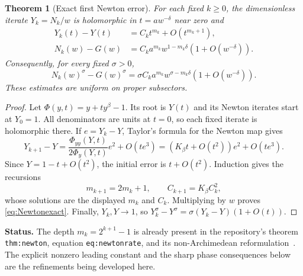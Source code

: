 \documentclass[11pt,a4paper]{article}
\newtheorem{theorem}{Theorem}[section]
\theoremstyle{definition}
\theoremstyle{remark}
\newcommand{\status}[1]{\par\smallskip\noindent\textbf{Status.} #1\par\smallskip}
\numberwithin{equation}{section}
\begin{document}
\begin{theorem}[Exact first Newton error]\label{thm:newtonexact}
For each fixed $k\ge0$, the dimensionless iterate $Y_k=N_k/w$ is holomorphic in $t=aw^{-\delta}$ near zero and
\begin{align}
 Y_k(t)-Y(t)&=C_k t^{m_k}+O(t^{m_k+1}),\label{eq:dimensionerror}\\
 N_k(w)-G(w)&=C_k a^{m_k}w^{1-m_k\delta}
 \left(1+O(w^{-\delta})\right).\label{eq:Newtonexact}
\end{align}
Consequently, for every fixed $\sigma>0$,
\begin{equation}\label{eq:newtonphaseerror}
 N_k(w)^\sigma-G(w)^\sigma
 =\sigma C_k a^{m_k}w^{\sigma-m_k\delta}
 \left(1+O(w^{-\delta})\right).
\end{equation}
These estimates are uniform on proper subsectors.
\end{theorem}
\begin{proof}
Let $\Phi(y,t)=y+ty^\beta-1$. Its root is $Y(t)$ and its Newton iterates start at $Y_0=1$. All denominators are units at $t=0$, so each fixed iterate is holomorphic there. If $e=Y_k-Y$, Taylor's formula for the Newton map gives
\[
 Y_{k+1}-Y
 =\frac{\Phi_{yy}(Y,t)}{2\Phi_y(Y,t)}e^2+O(te^3)
 =\left(K_\beta t+O(t^2)\right)e^2+O(te^3).
\]
Since $Y=1-t+O(t^2)$, the initial error is $t+O(t^2)$. Induction gives the recursions
\[
 m_{k+1}=2m_k+1,\qquad C_{k+1}=K_\beta C_k^2,
\]
whose solutions are the displayed $m_k$ and $C_k$. Multiplying by $w$ proves \eqref{eq:Newtonexact}. Finally, $Y_k,Y\to1$, so
$Y_k^\sigma-Y^\sigma=\sigma(Y_k-Y)(1+O(t))$.
\end{proof}

\status{The depth $m_k=2^{k+1}-1$ is already present in the repository's theorem \texttt{thm:newton}, equation \texttt{eq:newtonrate}, and its non-Archimedean reformulation~\cite{RepoSupport,RepoNonArch}. The explicit nonzero leading constant and the sharp phase consequences below are the refinements being developed here.}
\end{document}
